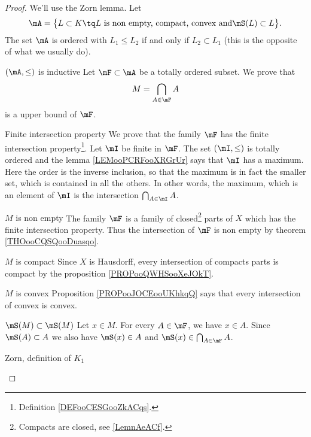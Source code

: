 \begin{proof}
    We'll use the Zorn lemma. Let 
    \begin{equation}
        \mA=\big\{  L\subset K\tq L \text{ is non empty, compact, convex and} \mS(L)\subset L   \big\}.
    \end{equation}
    The set \( \mA\) is ordered with \( L_1\leq L_2\) if and only if \( L_2\subset L_1\) (this is the opposite of what we usually do).

    \begin{subproof}
    \item[\( (\mA, \leq)\) is inductive]
        Let \( \mF\subset \mA\) be a totally ordered subset. We prove that 
        \begin{equation}
            M=\bigcap_{A\in \mF}A
        \end{equation}
        is a upper bound of \( \mF\).
        \begin{subproof}
        \item[Finite intersection property]
            We prove that the family \( \mF\) has the finite intersection property\footnote{Definition \ref{DEFooCESGooZkACqs}.}. Let \( \mI\) be finite in \( \mF\). The set \( (\mI,\leq)\) is totally ordered and the lemma \ref{LEMooPCRFooXRGrUr} says that \( \mI\) has a maximum. Here the order is the inverse inclusion, so that the maximum is in fact the smaller set, which is contained in all the others. In other words, the maximum, which is an element of \( \mI\) is the intersection \( \bigcap_{A\in\mI}A\).
        \item[\( M\) is non empty]
            The family \( \mF\) is a family of closed\footnote{Compacts are closed, see \ref{LemnAeACf}.} parts of \( X\) which has the finite intersection property. Thus the intersection of \( \mF\) is non empty by theorem \ref{THOooCQSQooDuasqo}.
            \item[\( M\) is compact] 
            Since \( X\) is Hausdorff, every intersection of compacts parts is compact by the proposition \ref{PROPooQWHSooXeJOkT}.
        \item[\( M\) is convex]
            Proposition \ref{PROPooJOCEooUKhkqQ} says that every intersection of convex is convex.
        \item[\( \mS(M)\subset\mS(M)\)]
            Let \( x\in M\). For every \( A\in \mF\), we have \( x\in A\). Since \( \mS(A)\subset A\) we also have \( \mS(x)\in A\) and \( \mS(x)\in \bigcap_{A\in\mF}A\).
        \end{subproof}
    \item[Zorn, definition of \( K_1\)] 

\end{subproof}
\end{proof}

